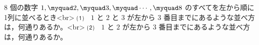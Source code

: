 $8$ 個の数字 $1,\myquad 2,\myquad 3,\myquad \cdots,\myquad 8$ 
のすべてを左から順に1列に並べるとき<br>
⑴　$1$ と $2$ と $3$ が左から $3$ 番目までにあるような並べ方は，何通りあるか。<br>
⑵　$1$ と $2$ が左から $3$ 番目までにあるような並べ方は，何通りあるか。